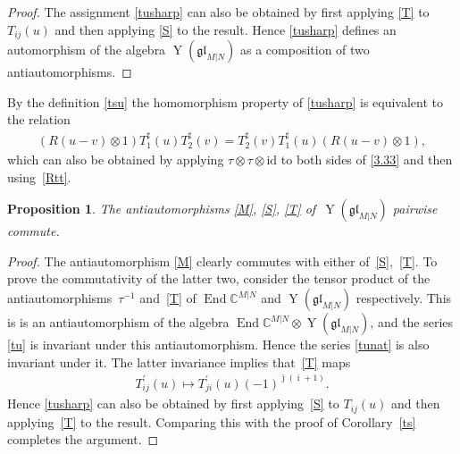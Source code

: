 \documentclass[11pt]{article}
\numberwithin{equation}{section}
\newtheorem{Proposition}[Theorem]{Proposition}
\def\1{^{-1}}
\def\bi{{\bar\imath }}
\def\bj{{\bar\jmath }}
\def\CC{{\mathbb{C}}}
\def\CMN{\CC^{M|N}}
\def\End{\operatorname{End}}
\def\glMN{\mathfrak{gl}_{M|N}}
\def\id{{\mathrm{id}}}
\def\ot{\otimes}
\def\TP{T^{\prime}}
\def\TS{T^{\sharp}}
\def\YMN{\operatorname{Y}(\glMN)}
\begin{document}
\begin{proof}
The assignment \eqref{tusharp} can also be obtained by first applying
\eqref{T} to $T_{ij}(u)$ and then applying \eqref{S} to the result.
Hence \eqref{tusharp} defines an automorphism of the algebra
$\YMN$ as a composition of two antiautomorphisms.
\end{proof}

By the definition \eqref{tsu} the homomorphism property of %
\eqref{tusharp} is equivalent to the relation
\begin{gather}
\label{3.333}
(R (u-v)\ot1) \TS_1(u) \TS_2(v)=
\TS_2(v) \TS_1(u)(R (u-v)\ot1),
\end{gather}
which can also be obtained by applying
$\tau\ot\tau\ot\id$ to both sides of \eqref{3.33}
and then using~\eqref{Rtt}.

\begin{Proposition}\label{mst}
The antiautomorphisms \eqref{M}, \eqref{S}, \eqref{T} of~$\YMN$ pairwise commute.
\end{Proposition}

\begin{proof}The antiautomorphism \eqref{M} clearly commutes with either of~\eqref{S},~\eqref{T}.
To prove the commutativity of the latter two, consider the tensor product of the antiautomorphisms~$\tau\1$ and~\eqref{T}
of $\End\CMN$ and $\YMN$ respectively. This is
is an antiautomorphism of the
algebra $\End\CMN\ot\YMN $, and the series \eqref{tu} is invariant
under this antiautomorphism. Hence the series \eqref{tunat}
is also invariant under it.
The latter invariance implies that~\eqref{T} maps
\begin{gather*}%
\TP_{ij}(u)\mapsto\TP_{ji}(u) {(-1)}^{\bj ( \bi + 1)} .
\end{gather*}
Hence \eqref{tusharp} can also be obtained by first applying~\eqref{S} to $T_{ij}(u)$ and then applying~\eqref{T} to the result.
Comparing this with the proof of Corollary~\ref{ts} completes the argument.
\end{proof}
\end{document}
